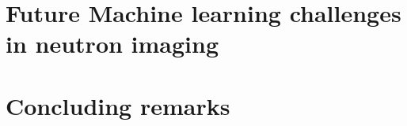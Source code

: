 \documentclass[letterpaper,10pt,english]{sphinxmanual}
\begin{document}
\chapter{Future Machine learning challenges in neutron imaging}
\label{\detokenize{ML4NeutronImageSegmentation:future-machine-learning-challenges-in-neutron-imaging}}

\chapter{Concluding remarks}
\label{\detokenize{ML4NeutronImageSegmentation:concluding-remarks}}






\renewcommand{\indexname}{Index}
\printindex
\end{document}
